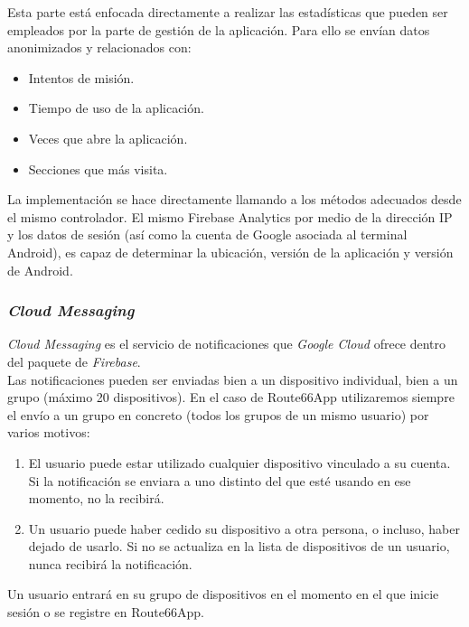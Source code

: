 \documentclass[twoside]{report}
\begin{document}
Esta parte está enfocada directamente a realizar las estadísticas que pueden ser empleados por la parte de gestión de la aplicación. Para ello se envían datos anonimizados y relacionados con:

\begin{itemize}
\item Intentos de misión.
\item Tiempo de uso de la aplicación.
\item Veces que abre la aplicación.
\item Secciones que más visita.
\end{itemize}

La implementación se hace directamente llamando a los métodos adecuados desde el mismo controlador. El mismo Firebase Analytics por medio de la dirección IP y los datos de sesión (así como la cuenta de Google asociada al terminal Android), es capaz de determinar la ubicación, versión de la aplicación y versión de Android.

\subsubsection{\textit{Cloud Messaging}}

\textit{Cloud Messaging} es el servicio de notificaciones que \textit{Google Cloud} ofrece dentro del paquete de \textit{Firebase}. \\

Las notificaciones pueden ser enviadas bien a un dispositivo individual, bien a un grupo (máximo 20 dispositivos). En el caso de Route66App utilizaremos siempre el envío a un grupo en concreto (todos los grupos de un mismo usuario) por varios motivos:

\begin{enumerate}
\item El usuario puede estar utilizado cualquier dispositivo vinculado a su cuenta. Si la notificación se enviara a uno distinto del que esté usando en ese momento, no la recibirá.

\item Un usuario puede haber cedido su dispositivo a otra persona, o incluso, haber dejado de usarlo. Si no se actualiza en la lista de dispositivos de un usuario, nunca recibirá la notificación.
\end{enumerate}

Un usuario entrará en su grupo de dispositivos en el momento en el que inicie sesión o se registre en Route66App.
\end{document}
